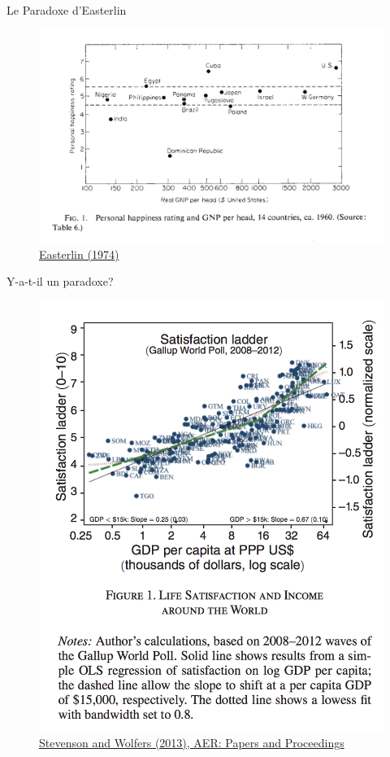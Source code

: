 \documentclass[handout]{beamer}
\begin{document}
\begin{frame}{Le Paradoxe d'Easterlin}

\begin{figure}
\centering
\includegraphics[scale=0.3]{easterlin.png}
\caption{\href{http://graphics8.nytimes.com/images/2008/04/16/business/Easterlin1974.pdf}{Easterlin (1974)}}
\end{figure}

\end{frame}


\begin{frame}{Y-a-t-il un paradoxe?}

\begin{figure}
\centering
\includegraphics[scale=0.3]{wolfers.png}
\caption{\href{http://users.nber.org/~jwolfers/papers/Satiation(AER).pdf}{Stevenson and Wolfers (2013), AER: Papers and Proceedings}
}
\end{figure}

\end{frame}
\end{document}
